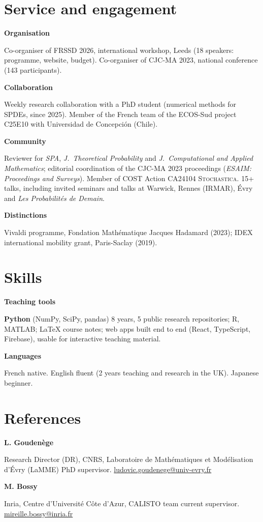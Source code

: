 \documentclass[10pt,a4paper]{article}
\newlength{\datecol}\setlength{\datecol}{0.155\textwidth}
\newlength{\gutter}\setlength{\gutter}{0.85em}
\newlength{\bodycol}
\newcommand{\skillrow}[2]{%
  \par\noindent
  \begin{minipage}[t]{\datecol}
    \vspace{0pt}\raggedright{\headingfont\bfseries\footnotesize #1}
  \end{minipage}%
  \hspace{\gutter}%
  \begin{minipage}[t]{\bodycol}
    \vspace{0pt}\raggedright\footnotesize #2
  \end{minipage}%
  \par\vspace{0.35ex}
}
\begin{document}
\section{Service and engagement}
\skillrow{Organisation}{Co-organiser of FRSSD 2026, international workshop, Leeds (18 speakers: programme,
website, budget). Co-organiser of CJC-MA 2023, national conference (143 participants).}
\skillrow{Collaboration}{Weekly research collaboration with a PhD student (numerical methods for SPDEs, since
2025). Member of the French team of the ECOS-Sud project C25E10 with Universidad de Concepción (Chile).}
\skillrow{Community}{Reviewer for \emph{SPA}, \emph{J.\ Theoretical Probability} and \emph{J.\ Computational and Applied Mathematics}; editorial coordination of the CJC-MA 2023 proceedings (\emph{ESAIM: Proceedings and Surveys}). Member of COST Action CA24104 \textsc{Stochastica}. 15+
talks, including invited seminars and talks at Warwick, Rennes (IRMAR), Évry and \emph{Les Probabilités de Demain}.}
\skillrow{Distinctions}{Vivaldi programme, Fondation Mathématique Jacques Hadamard (2023); IDEX international
mobility grant, Paris-Saclay (2019).}

\section{Skills}
\skillrow{Teaching tools}{\textbf{Python} (NumPy, SciPy, pandas) \textemdash{} 8 years, 5 public research repositories; R, MATLAB; \LaTeX{}
course notes; web apps built end to end (React, TypeScript, Firebase), usable for interactive teaching material.}
\skillrow{Languages}{French \textemdash{} native. English \textemdash{} fluent (2 years teaching and research in
the UK). Japanese \textemdash{} beginner.}

\section{References}
\skillrow{L. Goudenège}{Research Director (DR), CNRS, Laboratoire de Mathématiques et Modélisation d'Évry (LaMME) \textemdash{} PhD supervisor.
\href{mailto:ludovic.goudenege@univ-evry.fr}{ludovic.goudenege@univ-evry.fr}}
\skillrow{M. Bossy}{Inria, Centre d'Université Côte d'Azur, CALISTO team \textemdash{} current supervisor.
\href{mailto:mireille.bossy@inria.fr}{mireille.bossy@inria.fr}}
\end{document}
